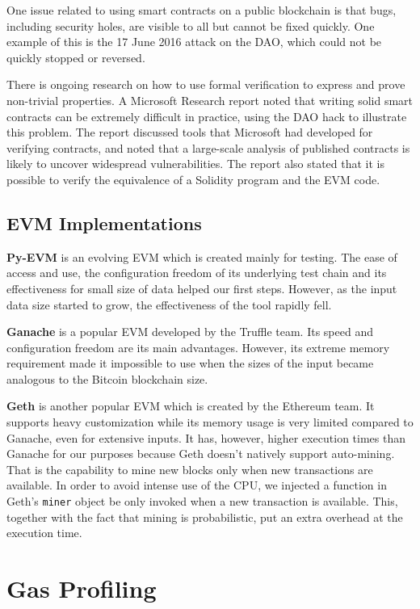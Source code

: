 One issue related to using smart contracts on a public blockchain is that bugs,
including security holes, are visible to all but cannot be fixed quickly.
One example of this is the 17 June 2016 attack on the DAO, which could not be
quickly stopped or reversed.

There is ongoing research on how to use formal verification to express and
prove non-trivial properties. A Microsoft Research report noted that writing
solid smart contracts can be extremely difficult in practice, using the DAO
hack to illustrate this problem. The report discussed tools that Microsoft had
developed for verifying contracts, and noted that a large-scale analysis of
published contracts is likely to uncover widespread vulnerabilities. The report
also stated that it is possible to verify the equivalence of a Solidity program
and the EVM code.

\subsection{EVM Implementations}

\textbf{Py-EVM} is an evolving EVM which is created mainly for testing. The
ease of access and use, the configuration freedom of its underlying test chain
and its effectiveness for small size of data helped our first steps. However,
as the input data size started to grow, the effectiveness of the tool rapidly
fell.

\noindent
\textbf{Ganache} is a popular EVM developed by the Truffle team. Its
speed and configuration freedom are its main advantages. However, its extreme
memory requirement made it impossible to use when the sizes of the input became
analogous to the Bitcoin blockchain size.

\noindent
\textbf{Geth} is another popular EVM which is created by the Ethereum
team. It supports heavy customization while its memory usage is very limited
compared to Ganache, even for extensive inputs. It has, however, higher
execution times than Ganache for our purposes because Geth doesn't natively
support auto-mining. That is the capability to mine new blocks only when new
transactions are available. In order to avoid intense use of the CPU, we
injected a function in Geth's \texttt{miner} object be only invoked when a new
transaction is available. This, together with the fact that mining is
probabilistic, put an extra overhead at the execution time.

\section{Gas Profiling}

